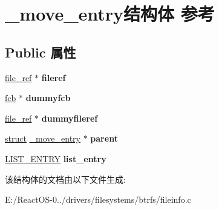 \hypertarget{struct__move__entry}{}\section{\+\_\+move\+\_\+entry结构体 参考}
\label{struct__move__entry}
\subsection*{Public 属性}
\begin{DoxyCompactItemize}
\item 
\mbox{\label{struct__move__entry_a6862c4eafbbe1811b1a1ea6511ff1d7f}} 
\hyperlink{struct__file__ref}{file\+\_\+ref} $\ast$ {\bfseries fileref}
\item 
\mbox{\label{struct__move__entry_a15e40ea62c697b50287eeeef0360c701}} 
\hyperlink{struct__fcb}{fcb} $\ast$ {\bfseries dummyfcb}
\item 
\mbox{\label{struct__move__entry_a6128f522ae95dba0e829693e429b6630}} 
\hyperlink{struct__file__ref}{file\+\_\+ref} $\ast$ {\bfseries dummyfileref}
\item 
\mbox{\label{struct__move__entry_ad5359005b312b61d405b239c731c4215}} 
\hyperlink{interfacestruct}{struct} \hyperlink{struct__move__entry}{\+\_\+move\+\_\+entry} $\ast$ {\bfseries parent}
\item 
\mbox{\label{struct__move__entry_a4b39a8fef49a77b7a3ce533cabeb69f2}} 
\hyperlink{struct___l_i_s_t___e_n_t_r_y}{L\+I\+S\+T\+\_\+\+E\+N\+T\+RY} {\bfseries list\+\_\+entry}
\end{DoxyCompactItemize}


该结构体的文档由以下文件生成\+:\begin{DoxyCompactItemize}
\item 
E\+:/\+React\+O\+S-\/0../drivers/filesystems/btrfs/fileinfo.\+c\end{DoxyCompactItemize}
